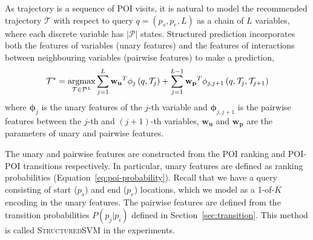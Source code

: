 As trajectory is a sequence of POI visits,
it is natural to model the recommended trajectory $\mathcal{T}$ with respect to query $q = (p_s, p_e, L)$
as a chain of $L$ variables, where each discrete variable has $|\mathcal{P}|$ states.
Structured prediction incorporates both the features of variables (unary features) and
the features of interactions between neighbouring variables (pairwise features) to make a
prediction,
\begin{displaymath}
    \mathcal{T}^* = \operatorname*{argmax}_{\mathcal{T} \in \mathcal{P}^L} 
                    \sum_{j=1}^L \mathbf{w_u}^T \mathbf{\phi}_j \left( q, \mathcal{T}_j \right) +
                    \sum_{j=1}^{L-1} \mathbf{w_p}^T \mathbf{\phi}_{j, j+1} \left( q, \mathcal{T}_j, \mathcal{T}_{j+1} \right)
\end{displaymath}
where $\mathbf{\phi}_j$ is the unary features of the $j$-th variable and $\mathbf{\phi}_{j, j+1}$ is the pairwise features between
the $j$-th and $(j+1)$-th variables, $\mathbf{w_u}$ and $\mathbf{w_p}$ are the
parameters of unary and pairwise features.

The unary and pairwise features are constructed from the POI ranking and POI-POI transitions respectively.
In particular, unary features are defined as ranking probabilities (Equation~\ref{eq:poi-probability}).
Recall that we have a query consisting of start ($p_s$) and end ($p_e$) locations, which
we model as a 1-of-$K$ encoding in the unary features.
The pairwise features are defined from the transition probabilities $P(p_j | p_i)$ defined in
Section~\ref{sec:transition}.
This method is called \textsc{StructuredSVM} in the experiments.

